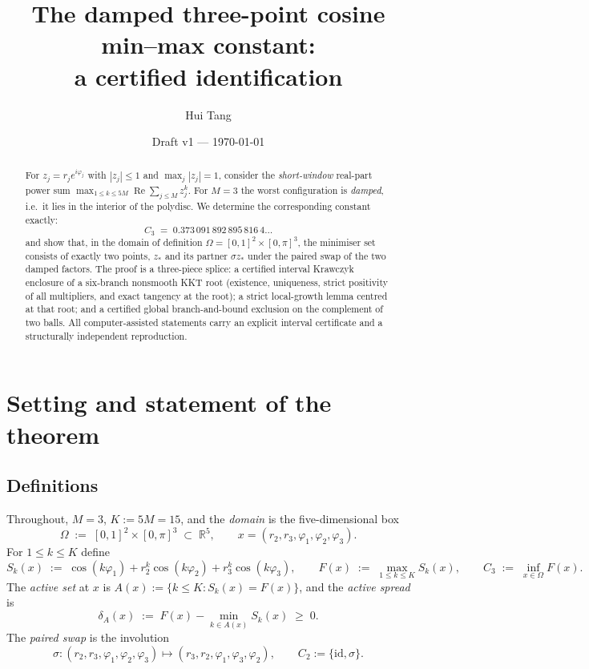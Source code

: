 \documentclass[11pt]{article}
\title{The damped three-point cosine min--max constant:\\ a certified identification}
\author{Hui Tang}
\date{Draft v1 --- \today}
\theoremstyle{remark}
\newcommand{\R}{\mathbb{R}}
\newcommand{\Om}{\Omega}
\begin{document}
\maketitle

\begin{abstract}
For $z_j=r_j e^{i\varphi_j}$ with $|z_j|\le 1$ and $\max_j|z_j|=1$, consider the
\emph{short-window} real-part power sum $\max_{1\le k\le 5M}\operatorname{Re}\sum_{j\le M}z_j^k$.
For $M=3$ the worst configuration is \emph{damped}, i.e.\ it lies in the interior of the polydisc.
We determine the corresponding constant exactly:
\[
C_3 \;=\; 0.373\,091\,892\,895\,816\,4\ldots
\]
and show that, in the domain of definition $\Om=[0,1]^2\times[0,\pi]^3$, the minimiser set consists of
exactly two points, $z_*$ and its partner $\sigma z_*$ under the paired swap of the two damped factors.
The proof is a three-piece splice: a certified interval Krawczyk enclosure of a six-branch nonsmooth KKT
root (existence, uniqueness, strict positivity of all multipliers, and exact tangency at the root); a
strict local-growth lemma centred at that root; and a certified global branch-and-bound exclusion on the
complement of two balls. All computer-assisted statements carry an explicit interval certificate and a
structurally independent reproduction.
\end{abstract}

\tableofcontents

\section{Setting and statement of the theorem}

\subsection{Definitions}

Throughout, $M=3$, $K:=5M=15$, and the \emph{domain} is the five-dimensional box
\begin{equation}
\Om \;:=\; [0,1]^{2}\times[0,\pi]^{3}\;\subset\;\R^{5},
\qquad x=(r_2,r_3,\varphi_1,\varphi_2,\varphi_3).
\end{equation}
For $1\le k\le K$ define
\begin{equation}
S_k(x) \;:=\; \cos(k\varphi_1)+r_2^k\cos(k\varphi_2)+r_3^k\cos(k\varphi_3),
\qquad
F(x) \;:=\; \max_{1\le k\le K} S_k(x),
\qquad
C_3 \;:=\; \inf_{x\in\Om}F(x).
\end{equation}
The \emph{active set} at $x$ is $A(x):=\{k\le K: S_k(x)=F(x)\}$, and the \emph{active spread} is
\begin{equation}\label{eq:spread}
\delta_A(x) \;:=\; F(x)-\min_{k\in A(x)}S_k(x)\;\ge\;0 .
\end{equation}
The \emph{paired swap} is the involution
\begin{equation}\label{eq:swap}
\sigma:(r_2,r_3,\varphi_1,\varphi_2,\varphi_3)\longmapsto(r_3,r_2,\varphi_1,\varphi_3,\varphi_2),
\qquad C_2:=\{\mathrm{id},\sigma\} .
\end{equation}
\end{document}
